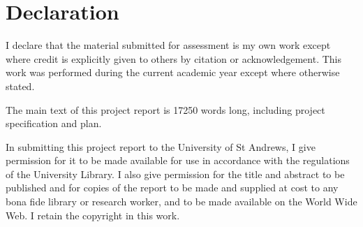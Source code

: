 


\chapter*{Declaration}

I declare that the material submitted for assessment is my own work except
where credit is explicitly given to others by citation or acknowledgement. This
work was performed during the current academic year except where otherwise
stated.

The main text of this project report is 17250 words long, including project
specification and plan.

In submitting this project report to the University of St Andrews, I give
permission for it to be made available for use in accordance with the
regulations of the University Library. I also give permission for the title and
abstract to be published and for copies of the report to be made and supplied
at cost to any bona fide library or research worker, and to be made available
on the World Wide Web. I retain the copyright in this work.


